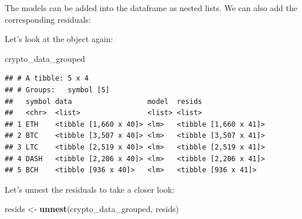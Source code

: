 \documentclass[
]{book}
\newenvironment{Shaded}{\begin{snugshade}}{\end{snugshade}}
\newcommand{\DataTypeTok}[1]{\textcolor[rgb]{0.13,0.29,0.53}{#1}}
\newcommand{\DecValTok}[1]{\textcolor[rgb]{0.00,0.00,0.81}{#1}}
\newcommand{\KeywordTok}[1]{\textcolor[rgb]{0.13,0.29,0.53}{\textbf{#1}}}
\newcommand{\NormalTok}[1]{#1}
\newcommand{\OperatorTok}[1]{\textcolor[rgb]{0.81,0.36,0.00}{\textbf{#1}}}
\newcommand{\OtherTok}[1]{\textcolor[rgb]{0.56,0.35,0.01}{#1}}
\newcommand{\StringTok}[1]{\textcolor[rgb]{0.31,0.60,0.02}{#1}}
\begin{document}
The models can be added into the dataframe as nested lists. We can also add the corresponding residuals:

\begin{Shaded}
\end{Shaded}

Let's look at the object again:

\begin{Shaded}
\begin{Highlighting}[]
\NormalTok{crypto_data_grouped}
\end{Highlighting}
\end{Shaded}

\begin{verbatim}
## # A tibble: 5 x 4
## # Groups:   symbol [5]
##   symbol data                  model  resids               
##   <chr>  <list>                <list> <list>               
## 1 ETH    <tibble [1,660 x 40]> <lm>   <tibble [1,660 x 41]>
## 2 BTC    <tibble [3,507 x 40]> <lm>   <tibble [3,507 x 41]>
## 3 LTC    <tibble [2,519 x 40]> <lm>   <tibble [2,519 x 41]>
## 4 DASH   <tibble [2,206 x 40]> <lm>   <tibble [2,206 x 41]>
## 5 BCH    <tibble [936 x 40]>   <lm>   <tibble [936 x 41]>
\end{verbatim}

Let's unnest the residuals to take a closer look:

\begin{Shaded}
\begin{Highlighting}[]
\NormalTok{resids <-}\StringTok{ }\KeywordTok{unnest}\NormalTok{(crypto_data_grouped, resids)}
\end{Highlighting}
\end{Shaded}

\begin{Shaded}
\end{Shaded}
\end{document}
